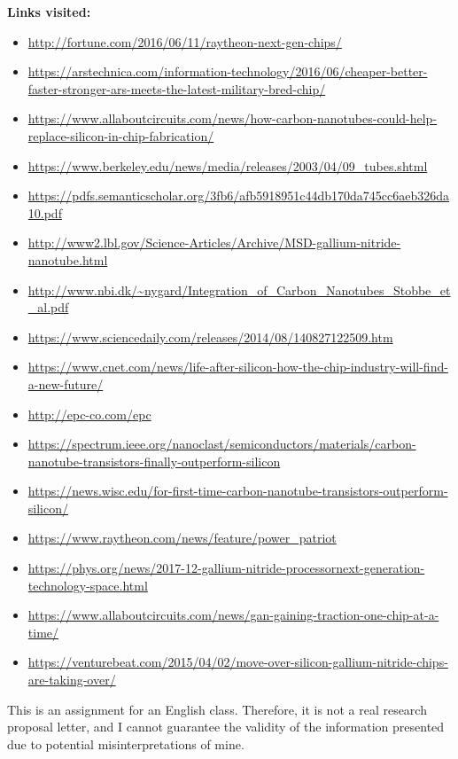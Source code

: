 \documentclass[letterpaper]{letter}
\begin{document}
\textbf{Links visited:}
\begin{itemize}
  \item \url{http://fortune.com/2016/06/11/raytheon-next-gen-chips/}
  \item \url{https://arstechnica.com/information-technology/2016/06/cheaper-better-faster-stronger-ars-meets-the-latest-military-bred-chip/}
  \item \url{https://www.allaboutcircuits.com/news/how-carbon-nanotubes-could-help-replace-silicon-in-chip-fabrication/}
  \item \url{https://www.berkeley.edu/news/media/releases/2003/04/09_tubes.shtml}
  \item \url{https://pdfs.semanticscholar.org/3fb6/afb5918951c44db170da745cc6aeb326da10.pdf}
  \item \url{http://www2.lbl.gov/Science-Articles/Archive/MSD-gallium-nitride-nanotube.html}
  \item \url{http://www.nbi.dk/~nygard/Integration_of_Carbon_Nanotubes_Stobbe_et_al.pdf}
  \item \url{https://www.sciencedaily.com/releases/2014/08/140827122509.htm}
  \item \url{https://www.cnet.com/news/life-after-silicon-how-the-chip-industry-will-find-a-new-future/}
  \item \url{http://epc-co.com/epc}
  \item \url{https://spectrum.ieee.org/nanoclast/semiconductors/materials/carbon-nanotube-transistors-finally-outperform-silicon}
  \item \url{https://news.wisc.edu/for-first-time-carbon-nanotube-transistors-outperform-silicon/}
  \item \url{https://www.raytheon.com/news/feature/power_patriot}
  \item \url{https://phys.org/news/2017-12-gallium-nitride-processornext-generation-technology-space.html}
  \item \url{https://www.allaboutcircuits.com/news/gan-gaining-traction-one-chip-at-a-time/}
  \item \url{https://venturebeat.com/2015/04/02/move-over-silicon-gallium-nitride-chips-are-taking-over/}
\end{itemize}
\vspace*{\fill}
This is an assignment for an English class. Therefore, it is not a real research
proposal letter, and I cannot guarantee the validity of the information
presented due to potential misinterpretations of mine.
\end{document}
